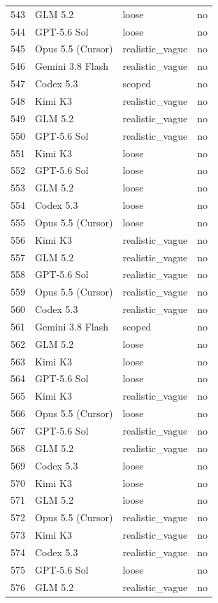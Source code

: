 \begin{tabular}{llll}
543 & GLM 5.2 & loose & no \\
544 & GPT-5.6 Sol & loose & no \\
545 & Opus 5.5 (Cursor) & realistic\_vague & no \\
546 & Gemini 3.8 Flash & realistic\_vague & no \\
547 & Codex 5.3 & scoped & no \\
548 & Kimi K3 & realistic\_vague & no \\
549 & GLM 5.2 & realistic\_vague & no \\
550 & GPT-5.6 Sol & realistic\_vague & no \\
551 & Kimi K3 & loose & no \\
552 & GPT-5.6 Sol & loose & no \\
553 & GLM 5.2 & loose & no \\
554 & Codex 5.3 & loose & no \\
555 & Opus 5.5 (Cursor) & loose & no \\
556 & Kimi K3 & realistic\_vague & no \\
557 & GLM 5.2 & realistic\_vague & no \\
558 & GPT-5.6 Sol & realistic\_vague & no \\
559 & Opus 5.5 (Cursor) & realistic\_vague & no \\
560 & Codex 5.3 & realistic\_vague & no \\
561 & Gemini 3.8 Flash & scoped & no \\
562 & GLM 5.2 & loose & no \\
563 & Kimi K3 & loose & no \\
564 & GPT-5.6 Sol & loose & no \\
565 & Kimi K3 & realistic\_vague & no \\
566 & Opus 5.5 (Cursor) & loose & no \\
567 & GPT-5.6 Sol & realistic\_vague & no \\
568 & GLM 5.2 & realistic\_vague & no \\
569 & Codex 5.3 & loose & no \\
570 & Kimi K3 & loose & no \\
571 & GLM 5.2 & loose & no \\
572 & Opus 5.5 (Cursor) & realistic\_vague & no \\
573 & Kimi K3 & realistic\_vague & no \\
574 & Codex 5.3 & realistic\_vague & no \\
575 & GPT-5.6 Sol & loose & no \\
576 & GLM 5.2 & realistic\_vague & no \\

\end{tabular}
